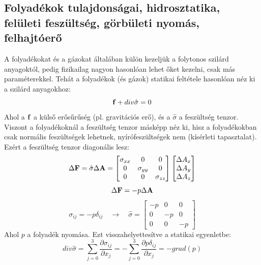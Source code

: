 \documentclass[a4paper,12pt]{article}
\begin{document}
\subsection{Folyadékok tulajdonságai, hidrosztatika, felületi feszültség, görbületi nyomás, felhajtóerő}
A folyadékokat és a gázokat általában külön kezeljük a folytonos szilárd anyagoktól, pedig fizikailag nagyon hasonlóan lehet őket kezelni, csak 
más paraméterekkel. Tehát a folyadékok (és gázok) statikai feltétele hasonlóan néz ki a szilárd anyagokhoz:
\begin{equation}
    \bold{f} + div \hat{\sigma} = 0
\end{equation}
Ahol a $\bold{f}$ a külső erősűrűség (pl. gravitációs erő), és a $\hat{\sigma}$ a feszültség tenzor. Viszont a folyadékoknál a feszültség tenzor
másképp néz ki, hisz a folyadékokban csak normális feszültségek lehetnek, nyírófeszültségek nem (kísérleti tapasztalat). Ezért a feszültség tenzor diagonális lesz:
\begin{equation}
    \Delta \bold{F} = \hat{\sigma} \Delta \bold{A} = \begin{bmatrix}
        \sigma_{xx} & 0 & 0 \\
        0 & \sigma_{yy} & 0 \\
        0 & 0 & \sigma_{zz}
    \end{bmatrix} \begin{bmatrix}
        \Delta A_x \\
        \Delta A_y \\
        \Delta A_z
    \end{bmatrix}
\end{equation}
\begin{equation}
    \Delta \bold{F} = - p \Delta \bold{A}
\end{equation}
\begin{equation}
    \sigma_{ij} = -p \delta_{ij} \quad \rightarrow \quad \hat{\sigma} = \begin{bmatrix}
        -p & 0 & 0 \\
        0 & -p & 0 \\
        0 & 0 & -p
    \end{bmatrix}
\end{equation}
Ahol $p$ a folyadék nyomása. Ezt visszahelyettesítve a statikai egyenletbe:
\begin{equation}
    div \hat{\sigma} = \sum_{j = 0}^{3}\frac{\partial \sigma_{ij}}{\partial x_j} = - \sum_{j = 0}^{3} \frac{\partial p \delta_{ij}}{\partial x_j} = - grad(p)
\end{equation}
\end{document}
